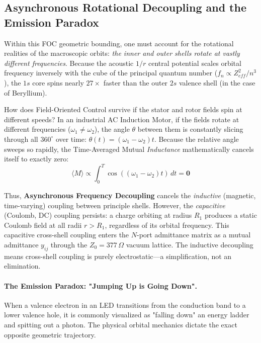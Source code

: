 \subsection{Asynchronous Rotational Decoupling and the Emission Paradox}
Within this FOC geometric bounding, one must account for the rotational realities of the macroscopic orbits: \textit{the inner and outer shells rotate at vastly different frequencies}. Because the acoustic $1/r$ central potential scales orbital frequency inversely with the cube of the principal quantum number ($f_n \propto Z_{eff}^2 / n^3$), the $1s$ core spins nearly $27\times$ faster than the outer $2s$ valence shell (in the case of Beryllium).

How does Field-Oriented Control survive if the stator and rotor fields spin at different speeds?
In an industrial AC Induction Motor, if the fields rotate at different frequencies ($\omega_1 \neq \omega_2$), the angle $\theta$ between them is constantly slicing through all $360^\circ$ over time: $\theta(t) = (\omega_1 - \omega_2)t$. Because the relative angle sweeps so rapidly, the Time-Averaged Mutual \emph{Inductance} mathematically cancels itself to exactly zero:
\begin{equation}
    \langle M \rangle \propto \int_0^T \cos((\omega_1 - \omega_2)t) \, dt = \mathbf{0}
\end{equation}

Thus, \textbf{Asynchronous Frequency Decoupling} cancels the \emph{inductive} (magnetic, time-varying) coupling between principle shells. However, the \emph{capacitive} (Coulomb, DC) coupling persists: a charge orbiting at radius $R_1$ produces a static Coulomb field at all radii $r > R_1$, regardless of its orbital frequency. This capacitive cross-shell coupling enters the $N$-port admittance matrix as a mutual admittance $y_{ij}$ through the $Z_0 = 377\,\Omega$ vacuum lattice. The inductive decoupling means cross-shell coupling is purely electrostatic---a simplification, not an elimination.

\paragraph{The Emission Paradox: "Jumping Up is Going Down".}
When a valence electron in an LED transitions from the conduction band to a lower valence hole, it is commonly visualized as "falling down" an energy ladder and spitting out a photon. The physical orbital mechanics dictate the exact opposite geometric trajectory. 

